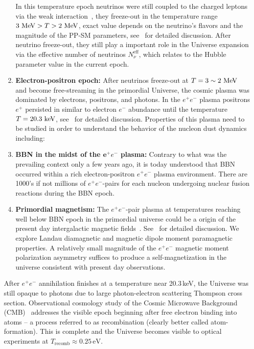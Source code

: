\begin{enumerate}
In this temperature epoch neutrinos were still coupled to the charged leptons via the weak interaction~\cite{Birrell:2012gg,Birrell:2014ona}, they freeze-out in the temperature range $3\text{ MeV} >T>2\text{ MeV}$, exact value depends on the neutrino's flavors and the magnitude of the PP-SM parameters, see~ for detailed discussion. After neutrino freeze-out, they still play a important role in the Universe expansion via the effective number of neutrinos $N_{\nu}^{\mathrm{eff}}$, which relates to the Hubble parameter value in the current epoch.
%
\item \textbf{Electron-positron epoch:} After neutrinos freeze-out at $T=3\sim 2\text{ MeV}$ and become free-streaming in the primordial Universe, the cosmic plasma was dominated by electrons, positrons, and photons. In the $e^+e^-$ plasma positrons $e^+$ persisted in similar to electron $e^-$ abundance until the temperature $T=20.3\text{ keV}$, see~ for detailed discussion. Properties of this plasma need to be studied in order to understand the behavior of the nucleon dust dynamics including:
%
\item \textbf{BBN in the midst of the ${\mathbf e^+e^-}$ plasma:} Contrary to what was the prevailing context only a few years ago, it is today understood that BBN occurred within a rich electron-positron $e^+e^-$ plasma environment. There are 1000's if not millions of ${ e^+e^-}$-pairs for each nucleon undergoing nuclear fusion reactions during the BBN epoch. 
%
\item \textbf{Primordial magnetism:} The $e^{+}e^{-}$-pair plasma at temperatures reaching well below BBN epoch in the primordial universe could be a origin of the present day intergalactic magnetic fields~\cite{Rafelski:2023emw,Steinmetz:2023nsc}. See~ for detailed discussion. We explore Landau diamagnetic and magnetic dipole moment paramagnetic properties. A relatively small magnitude of the $e^{+}e^{-}$ magnetic moment polarization asymmetry suffices to produce a self-magnetization in the universe consistent with present day observations.
\end{enumerate}

After $e^+e^-$ annihilation finishes at a temperature near 20.3\,keV, the Universe was still opaque to photons due to large photon-electron scattering Thompson cross section. Observational cosmology study of the Cosmic Microwave Background (CMB)~\cite{Planck:2018vyg} addresses the visible epoch beginning after free electron binding into atoms -- a process referred to as recombination (clearly better called atom-formation). This is complete and the Universe becomes visible to optical experiments at $T_\mathrm{recomb}\approx 0.25\,\mathrm{eV}$. 

